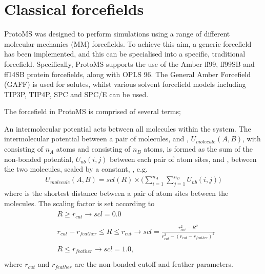 \documentclass[letterpaper,10pt,english]{sphinxmanual}
\begin{document}
\ignorespaces 

\section{Classical forcefields}
\label{\detokenize{protoms:classical-forcefields}}\label{\detokenize{protoms:index-5}}
ProtoMS was designed to perform simulations using a range of different molecular mechanics (MM) forcefields. To achieve this aim, a generic forcefield has been implemented, and this can be specialised into a specific, traditional forcefield. Specifically, ProtoMS supports the use of the Amber ff99, ff99SB and ff14SB protein forcefields, along with OPLS 96. The General Amber Forcefield (GAFF) is used for solutes, whilst various solvent forcefield models including TIP3P, TIP4P, SPC and SPC/E can be used.

The forcefield in ProtoMS is comprised of several terms;

\ignorespaces 
{}

An intermolecular potential acts between all molecules within the system. The intermolecular potential between a pair of molecules,  and , \(U_{molecule} (A, B)\), with  consisting of \(n_A\) atoms and  consisting of \(n_B\) atoms, is formed as the sum of the non-bonded potential, \(U_{nb} (i, j)\) between each pair of atom sites,  and , between the two molecules, scaled by a constant, , e.g.
\begin{equation}\label{equation:protoms:intermol1}
\begin{split}U_{molecule}(A,B) = scl(R)\times\biggl( \sum_{i=1}^{n_A} \sum_{j=1}^{n_B} U_{nb}(i,j) \biggr)\end{split}
\end{equation}
where  is the shortest distance between a pair of atom sites between the molecules. The scaling factor is set according to
\begin{align*}\!\begin{aligned}
&R \ge r_{cut} \rightarrow scl = 0.0 \\\\
&r_{cut}-r_{feather} \le R \le r_{cut} \rightarrow scl = \frac{r_{cut}^2-R^2}{r_{cut}^2-(r_{cut}-r_{feather})^2} \\\\
&R \le r_{feather} \rightarrow scl = 1.0,\\
\end{aligned}\end{align*}
where \(r_{cut}\) and \(r_{feather}\) are the non-bonded cutoff and feather parameters.
\end{document}
